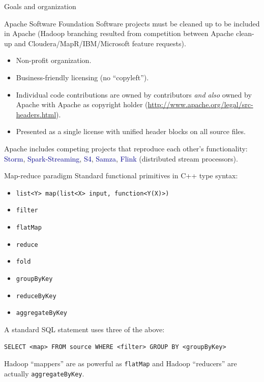 \documentclass{beamer}
\begin{document}
\begin{frame}{Goals and organization}

\begin{block}{Apache Software Foundation}
Software projects must be cleaned up to be included in Apache (Hadoop branching resulted from competition between Apache clean-up and Cloudera/MapR/IBM/Microsoft feature requests).

\begin{itemize}
\item Non-profit organization.
\item Business-friendly licensing (no ``copyleft'').
\item Individual code contributions are owned by contributors {\it and also} owned by Apache with Apache as copyright holder (\url{http://www.apache.org/legal/src-headers.html}).
\item Presented as a single license with unified header blocks on all source files.
\end{itemize}

Apache includes competing projects that reproduce each other's functionality: \textcolor{darkblue}{Storm}, \textcolor{darkblue}{Spark-Streaming}, \textcolor{darkblue}{S4}, \textcolor{darkblue}{Samza}, \textcolor{darkblue}{Flink} (distributed stream processors).
\end{block}
\end{frame}

\begin{frame}[fragile]{Map-reduce paradigm}
Standard functional primitives in C++ type syntax:
\begin{itemize}
\item {\tt list<Y> map(list<X> input, function<Y(X)>)}
\item {\tt filter}
\item {\tt flatMap}
\item {\tt reduce}
\item {\tt fold}
\item {\tt groupByKey}
\item {\tt reduceByKey}
\item {\tt aggregateByKey}
\end{itemize}

\vspace{0.5 cm}
A standard SQL statement uses three of the above:

\begin{verbatim}
SELECT <map> FROM source WHERE <filter> GROUP BY <groupByKey>
\end{verbatim}

\vspace{0.5 cm}
Hadoop ``mappers'' are as powerful as {\tt flatMap} and Hadoop ``reducers'' are actually {\tt aggregateByKey}.
\end{frame}
\end{document}
